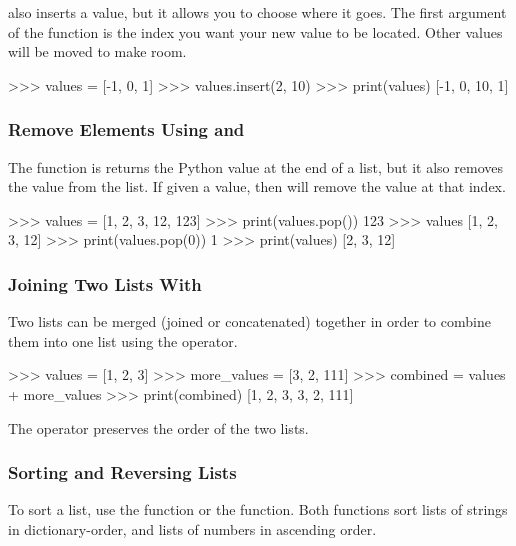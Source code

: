 \documentclass[11pt]{cselabheader}
\begin{document}
 also inserts a value, but it allows you to choose where it
goes. The first argument of the function is the index you want your new value to
be located. Other values will be moved to make room.

\begin{pyconcode}
>>> values = [-1, 0, 1]
>>> values.insert(2, 10)
>>> print(values)
[-1, 0, 10, 1]

\end{pyconcode}

\subsubsection{Remove Elements Using  and }

The  function is returns the Python
value at the end of a list, but it also removes the value from the list.
If given a value, then  will remove the
value at that index.

\begin{pyconcode}
>>> values = [1, 2, 3, 12, 123]
>>> print(values.pop())
123
>>> values
[1, 2, 3, 12]
>>> print(values.pop(0))
1
>>> print(values)
[2, 3, 12]

\end{pyconcode}


\subsubsection{Joining Two Lists With \pythoninline{+}}

Two lists can be merged (joined or concatenated) together in order to
combine them into one list using the \pythonindex{+} operator.

\begin{pyconcode}
>>> values = [1, 2, 3]
>>> more_values = [3, 2, 111]
>>> combined = values + more_values
>>> print(combined)
[1, 2, 3, 3, 2, 111]

\end{pyconcode}

The \pythoninline{+} operator preserves the order of the two lists.

\subsubsection{Sorting and Reversing Lists}

To sort a list, use the  function or the
 function. Both functions sort lists of strings
in dictionary-order, and lists of numbers in ascending order.
\end{document}
